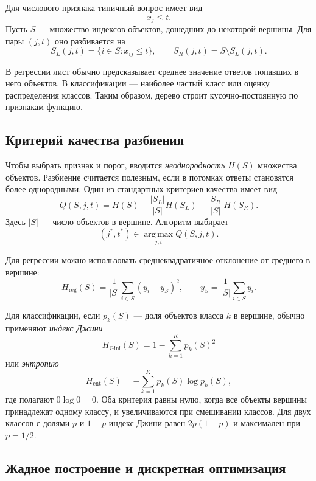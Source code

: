 \documentclass[12pt,a4paper]{article}
\begin{document}
Для числового признака типичный вопрос имеет вид
\[
    x_j\le t.
\]
Пусть $S$ --- множество индексов объектов, дошедших до некоторой
вершины. Для пары $(j,t)$ оно разбивается на
\[
    S_L(j,t)=\{i\in S:x_{ij}\le t\},\qquad
    S_R(j,t)=S\setminus S_L(j,t).
\]

В регрессии лист обычно предсказывает среднее значение
ответов попавших в него объектов. В классификации ---
наиболее частый класс или оценку распределения классов.
Таким образом, дерево строит кусочно-постоянную по признакам функцию.

\subsection{Критерий качества разбиения}

Чтобы выбрать признак и порог, вводится \emph{неоднородность}
$H(S)$ множества объектов. Разбиение считается полезным,
если в потомках ответы становятся более однородными.
Один из стандартных критериев качества имеет вид
\begin{equation}
    Q(S,j,t)=H(S)
       -\frac{|S_L|}{|S|}H(S_L)
       -\frac{|S_R|}{|S|}H(S_R).
    \label{eq:tree-gain}
\end{equation}
Здесь $|S|$ --- число объектов в вершине.
Алгоритм выбирает
\[
    (j^*,t^*)\in\operatorname*{arg\,max}_{j,t}Q(S,j,t).
\]

Для регрессии можно использовать среднеквадратичное отклонение
от среднего в вершине:
\[
    H_{\mathrm{reg}}(S)=\frac1{|S|}
       \sum_{i\in S}(y_i-\overline y_S)^2,
    \qquad
    \overline y_S=\frac1{|S|}\sum_{i\in S}y_i.
\]

Для классификации, если $p_k(S)$ --- доля объектов класса $k$
в вершине, обычно применяют \emph{индекс Джини}
\begin{equation}
    H_{\mathrm{Gini}}(S)=1-\sum_{k=1}^{K}p_k(S)^2
    \label{eq:gini}
\end{equation}
или \emph{энтропию}
\begin{equation}
    H_{\mathrm{ent}}(S)=-\sum_{k=1}^{K}p_k(S)\log p_k(S),
    \label{eq:entropy}
\end{equation}
где полагают $0\log0=0$.
Оба критерия равны нулю, когда все объекты вершины принадлежат
одному классу, и увеличиваются при смешивании классов.
Для двух классов с долями $p$ и $1-p$
индекс Джини равен $2p(1-p)$ и максимален при $p=1/2$.

\subsection{Жадное построение и дискретная оптимизация}
\end{document}
